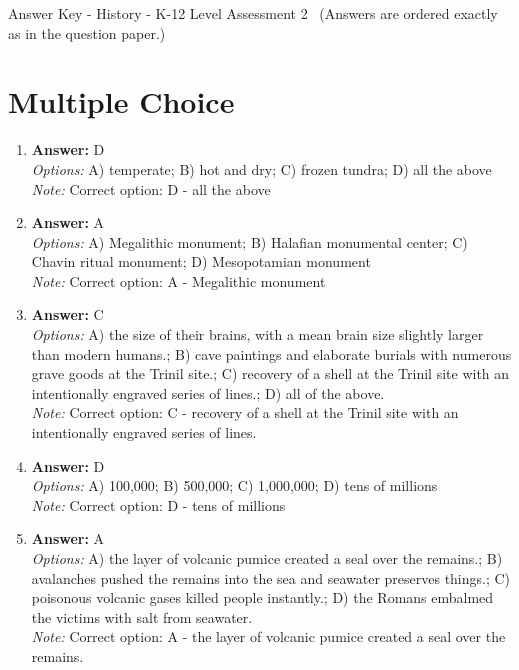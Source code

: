 \documentclass[12pt]{article}
\begin{document}
\begin{center}
Answer Key - History - K-12 Level Assessment 2 \
\small (Answers are ordered exactly as in the question paper.)
\end{center}

\section*{Multiple Choice}
\begin{enumerate}[label=\arabic*.]
\item \textbf{Answer:} D
\\ \textit{Options:} A) temperate; B) hot and dry; C) frozen tundra; D) all the above
\\ \textit{Note:} Correct option: D - all the above
\item \textbf{Answer:} A
\\ \textit{Options:} A) Megalithic monument; B) Halafian monumental center; C) Chavin ritual monument; D) Mesopotamian monument
\\ \textit{Note:} Correct option: A - Megalithic monument
\item \textbf{Answer:} C
\\ \textit{Options:} A) the size of their brains, with a mean brain size slightly larger than modern humans.; B) cave paintings and elaborate burials with numerous grave goods at the Trinil site.; C) recovery of a shell at the Trinil site with an intentionally engraved series of lines.; D) all of the above.
\\ \textit{Note:} Correct option: C - recovery of a shell at the Trinil site with an intentionally engraved series of lines.
\item \textbf{Answer:} D
\\ \textit{Options:} A) 100,000; B) 500,000; C) 1,000,000; D) tens of millions
\\ \textit{Note:} Correct option: D - tens of millions
\item \textbf{Answer:} A
\\ \textit{Options:} A) the layer of volcanic pumice created a seal over the remains.; B) avalanches pushed the remains into the sea and seawater preserves things.; C) poisonous volcanic gases killed people instantly.; D) the Romans embalmed the victims with salt from seawater.
\\ \textit{Note:} Correct option: A - the layer of volcanic pumice created a seal over the remains.
\end{enumerate}
\end{document}
